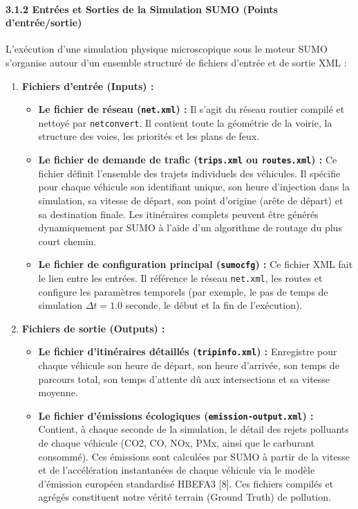 \documentclass[10pt, a4paper]{article}
\providecommand{\tightlist}{}
\begin{document}
\paragraph{3.1.2 Entrées et Sorties de la Simulation SUMO (Points
d'entrée/sortie)}\label{entruxe9es-et-sorties-de-la-simulation-sumo-points-dentruxe9esortie}

L'exécution d'une simulation physique microscopique sous le moteur SUMO
s'organise autour d'un ensemble structuré de fichiers d'entrée et de
sortie XML :

\begin{enumerate}
\def\labelenumi{\arabic{enumi}.}
\tightlist
\item
  \textbf{Fichiers d'entrée (Inputs) :}

  \begin{itemize}
  \tightlist
  \item
    \textbf{Le fichier de réseau (\texttt{net.xml}) :} Il s'agit du
    réseau routier compilé et nettoyé par \texttt{netconvert}. Il
    contient toute la géométrie de la voirie, la structure des voies,
    les priorités et les plans de feux.
  \item
    \textbf{Le fichier de demande de trafic (\texttt{trips.xml} ou
    \texttt{routes.xml}) :} Ce fichier définit l'ensemble des trajets
    individuels des véhicules. Il spécifie pour chaque véhicule son
    identifiant unique, son heure d'injection dans la simulation, sa
    vitesse de départ, son point d'origine (arête de départ) et sa
    destination finale. Les itinéraires complets peuvent être générés
    dynamiquement par SUMO à l'aide d'un algorithme de routage du plus
    court chemin.
  \item
    \textbf{Le fichier de configuration principal (\texttt{sumocfg}) :}
    Ce fichier XML fait le lien entre les entrées. Il référence le
    réseau \texttt{net.xml}, les routes et configure les paramètres
    temporels (par exemple, le pas de temps de simulation
    \(\Delta t = 1.0\) seconde, le début et la fin de l'exécution).
  \end{itemize}
\item
  \textbf{Fichiers de sortie (Outputs) :}

  \begin{itemize}
  \tightlist
  \item
    \textbf{Le fichier d'itinéraires détaillés (\texttt{tripinfo.xml})
    :} Enregistre pour chaque véhicule son heure de départ, son heure
    d'arrivée, son temps de parcours total, son temps d'attente dû aux
    intersections et sa vitesse moyenne.
  \item
    \textbf{Le fichier d'émissions écologiques
    (\texttt{emission-output.xml}) :} Contient, à chaque seconde de la
    simulation, le détail des rejets polluants de chaque véhicule (CO2,
    CO, NOx, PMx, ainsi que le carburant consommé). Ces émissions sont
    calculées par SUMO à partir de la vitesse et de l'accélération
    instantanées de chaque véhicule via le modèle d'émission européen
    standardisé HBEFA3 {[}8{]}. Ces fichiers compilés et agrégés
    constituent notre vérité terrain (Ground Truth) de pollution.
  \end{itemize}
\end{enumerate}
\end{document}
